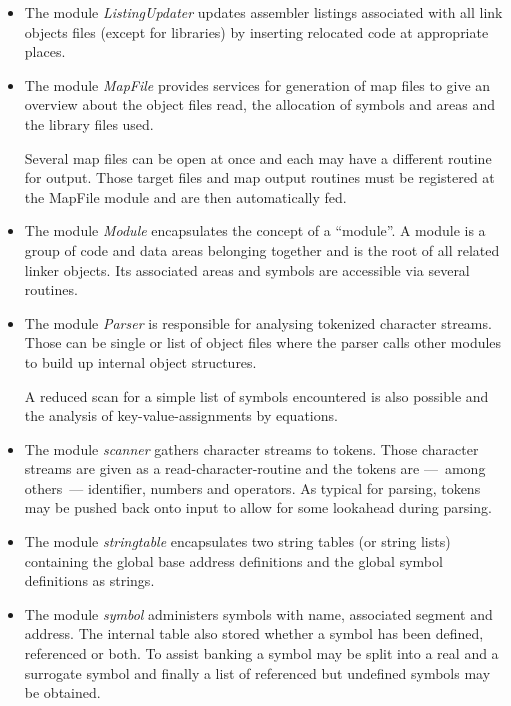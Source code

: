 \documentclass[10pt]{article}
\newcommand{\definition}[1]{\emph{#1}}
\begin{document}
\begin{itemize}
  \item The module \definition{ListingUpdater} updates assembler
        listings associated with all link objects files (except for
        libraries) by inserting relocated code at appropriate places.

  \item The module \definition{MapFile} provides services for
        generation of map files to give an overview about the object
        files read, the allocation of symbols and areas and the
        library files used.

        Several map files can be open at once and each may have a
        different routine for output.  Those target files and map
        output routines must be registered at the MapFile module and
        are then automatically fed.

  \item The module \definition{Module} encapsulates the concept of a
        ``module''.  A module is a group of code and data areas
        belonging together and is the root of all related linker
        objects.  Its associated areas and symbols are accessible via
        several routines.

  \item The module \definition{Parser} is responsible for analysing
        tokenized character streams.  Those can be single or list of
        object files where the parser calls other modules to build up
        internal object structures.

        A reduced scan for a simple list of symbols encountered is
        also possible and the analysis of key-value-assignments by
        equations.

  \item The module \definition{scanner} gathers character streams to
        tokens.  Those character streams are given as a
        read-character-routine and the tokens are ---~among others~---
        identifier, numbers and operators.  As typical for parsing,
        tokens may be pushed back onto input to allow for some
        lookahead during parsing.

  \item The module \definition{stringtable} encapsulates two string
        tables (or string lists) containing the global base address
        definitions and the global symbol definitions as strings.

  \item The module \definition{symbol} administers symbols with name,
        associated segment and address.  The internal table also
        stored whether a symbol has been defined, referenced or both.
        To assist banking a symbol may be split into a real and a
        surrogate symbol and finally a list of referenced but
        undefined symbols may be obtained.

\end{itemize}
\end{document}
